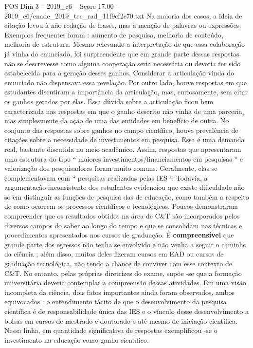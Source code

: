 \begin{textsample}{POS Dim 3 – 2019\_c6 – Score 17.00 – 2019\_c6/enade\_2019\_tec\_rad\_11f9cf2c70.txt}
Na maioria dos casos, a ideia de citação levou à não redação de frases, mas à menção de palavras ou expressões.
Exemplos frequentes foram : aumento de pesquisa, melhoria de conteúdo, melhoria de estrutura.
Mesmo relevando a interpretação de que essa colaboração já vinha do enunciado, foi surpreendente que em grande parte dessas respostas não se descrevesse como alguma cooperação seria necessária ou deveria ter sido estabelecida para a geração desses ganhos.
Considerar a articulação vinda do enunciado não dispensava essa revelação.
Por outro lado, houve respostas em que estudantes discutiram a importância da articulação, mas, curiosamente, sem citar os ganhos gerados por elas.
Essa dúvida sobre a articulação ficou bem caracterizada nas respostas em que o ganho descrito não vinha de uma parceria, mas simplesmente da ação de uma das entidades em benefício de outra.
No conjunto das respostas sobre ganhos no campo científico, houve prevalência de citações sobre a necessidade de investimentos em pesquisa.
Essa é uma demanda real, bastante discutida no meio acadêmico.
Assim, respostas que apresentaram uma estrutura do tipo “ maiores investimentos/financiamentos em pesquisas ” e valorização dos pesquisadores foram muito comuns.
Geralmente, elas se complementavam com “ pesquisas realizadas pelas IES ”.
Todavia, a argumentação inconsistente dos estudantes evidenciou que existe dificuldade não só em distinguir as funções de pesquisa das de educação, como também a respeito de como ocorrem os processos científicos e tecnológicos.
Poucos demonstraram compreender que os resultados obtidos na área de C\&T são incorporados pelos diversos campos do saber ao longo do tempo e que se consolidam nas técnicas e procedimentos apresentados nos cursos de graduação.
É \textbf{compreensível} que grande parte dos egressos não tenha se envolvido e não venha a seguir o caminho da ciência ; além disso, muitos deles fizeram cursos em EAD ou cursos de graduação tecnológica, não tendo a chance de conviver com esse contexto de C\&T.
No entanto, pelas próprias diretrizes do exame, supõe -se que a formação universitária deveria contemplar a compreensão dessas atividades.
Em uma visão incompleta da ciência, dois fatos importantes ainda foram observados, ambos equivocados : o entendimento tácito de que o desenvolvimento da pesquisa científica é de responsabilidade única das IES e o vínculo desse desenvolvimento a bolsas em cursos de mestrado e doutorado e até mesmo de iniciação científica.
Nessa linha, em quantidade significativa de respostas exemplificou -se o investimento na educação como ganho científico.

\end{textsample}
